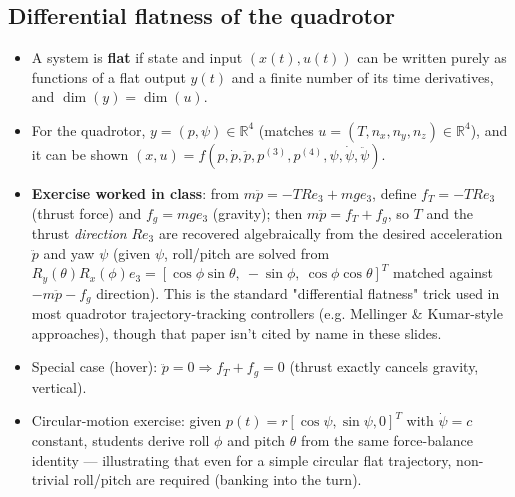 \documentclass[11pt]{article}
\begin{document}
\subsection{Differential flatness of the quadrotor}
\begin{itemize}
\item A system is \textbf{flat} if state and input $(x(t),u(t))$ can be written purely as functions of a flat output $y(t)$ and a finite number of its time derivatives, and $\dim(y)=\dim(u)$.
\item For the quadrotor, $y=(p,\psi)\in\mathbb{R}^4$ (matches $u=(T,n_x,n_y,n_z)\in\mathbb{R}^4$), and it can be shown $(x,u)=f(p,\dot p,\ddot p,p^{(3)},p^{(4)},\psi,\dot\psi,\ddot\psi)$.
\item \textbf{Exercise worked in class}: from $m\ddot p = -TRe_3+mge_3$, define $f_T=-TRe_3$ (thrust force) and $f_g=mge_3$ (gravity); then $m\ddot p=f_T+f_g$, so $T$ and the thrust \textit{direction} $Re_3$ are recovered algebraically from the desired acceleration $\ddot p$ and yaw $\psi$ (given $\psi$, roll/pitch are solved from $R_y(\theta)R_x(\phi)e_3 = [\cos\phi\sin\theta,\ -\sin\phi,\ \cos\phi\cos\theta]^T$ matched against $-m\ddot p - f_g$ direction). This is the standard "differential flatness" trick used in most quadrotor trajectory-tracking controllers (e.g. Mellinger \& Kumar-style approaches), though that paper isn't cited by name in these slides.
\item Special case (hover): $\ddot p=0 \Rightarrow f_T+f_g=0$ (thrust exactly cancels gravity, vertical).
\item Circular-motion exercise: given $p(t)=r[\cos\psi,\sin\psi,0]^T$ with $\dot\psi=c$ constant, students derive roll $\phi$ and pitch $\theta$ from the same force-balance identity — illustrating that even for a simple circular flat trajectory, non-trivial roll/pitch are required (banking into the turn).
\end{itemize}
\end{document}
